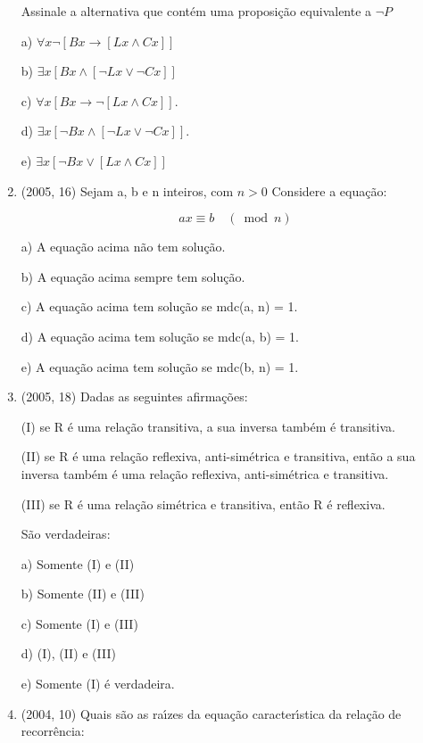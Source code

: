 \documentclass{article}
\begin{document}
\begin{enumerate}
Assinale a alternativa que contém uma proposição equivalente a $\neg P$

a) $\forall x \neg[B x \rightarrow[L x \wedge C x]]$

b) $\exists x[B x \wedge[\neg L x \vee \neg C x]]$

c) $\forall x[B x \rightarrow \neg[L x \wedge C x]] .$

d) $\exists x[\neg B x \wedge[\neg L x \vee \neg C x]] .$

e) $\exists x[\neg B x \vee[L x \wedge C x]]$ \newline





\item(2005, 16) Sejam a, b e n inteiros, com $n>0$ Considere a equação:

$$a x \equiv b \quad(\bmod n)$$


a) A equação acima não tem solução.

b) A equação acima sempre tem solução.

c) A equação acima tem solução se mdc(a, n) = 1.

d) A equação acima tem solução se mdc(a, b) = 1.

e) A equação acima tem solução se mdc(b, n) = 1.\newline






\item(2005, 18) Dadas as seguintes afirmações:

(I) se R é uma relação transitiva, a sua inversa também é transitiva.

(II) se R é uma relação reflexiva, anti-simétrica e transitiva, então a sua inversa
também é uma relação reflexiva, anti-simétrica e transitiva.

(III) se R é uma relação simétrica e transitiva, então R é reflexiva.

São verdadeiras:

a) Somente (I) e (II)

b) Somente (II) e (III)

c) Somente (I) e (III)

d) (I), (II) e (III)

e) Somente (I) é verdadeira. \newline






\item(2004, 10) Quais são as raı́zes da equação caracterı́stica da relação de recorrência: 


\end{enumerate}
\end{document}
